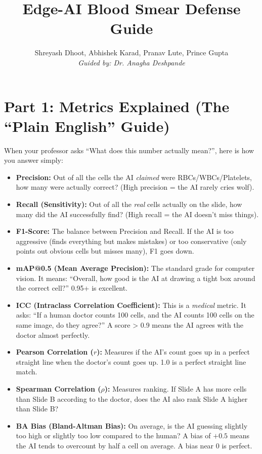\documentclass[12pt]{article}
\title{\textbf{Edge-AI Blood Smear Defense Guide}}
\author{Shreyash Dhoot, Abhishek Karad, Pranav Lute, Prince Gupta \\ \textit{Guided by: Dr. Anagha Deshpande}}
\date{}
\begin{document}
\maketitle

\section*{Part 1: Metrics Explained (The ``Plain English'' Guide)}
When your professor asks ``What does this number actually mean?'', here is how you answer simply:

\begin{itemize}
    \item \textbf{Precision:} Out of all the cells the AI \textit{claimed} were RBCs/WBCs/Platelets, how many were actually correct? (High precision = the AI rarely cries wolf).
    \item \textbf{Recall (Sensitivity):} Out of all the \textit{real} cells actually on the slide, how many did the AI successfully find? (High recall = the AI doesn't miss things).
    \item \textbf{F1-Score:} The balance between Precision and Recall. If the AI is too aggressive (finds everything but makes mistakes) or too conservative (only points out obvious cells but misses many), F1 goes down.
    \item \textbf{mAP@0.5 (Mean Average Precision):} The standard grade for computer vision. It means: ``Overall, how good is the AI at drawing a tight box around the correct cell?'' 0.95+ is excellent.
    \item \textbf{ICC (Intraclass Correlation Coefficient):} This is a \textit{medical} metric. It asks: ``If a human doctor counts 100 cells, and the AI counts 100 cells on the same image, do they agree?'' A score > 0.9 means the AI agrees with the doctor almost perfectly.
    \item \textbf{Pearson Correlation ($r$):} Measures if the AI's count goes up in a perfect straight line when the doctor's count goes up. 1.0 is a perfect straight line match.
    \item \textbf{Spearman Correlation ($\rho$):} Measures ranking. If Slide A has more cells than Slide B according to the doctor, does the AI also rank Slide A higher than Slide B? 
    \item \textbf{BA Bias (Bland-Altman Bias):} On average, is the AI guessing slightly too high or slightly too low compared to the human? A bias of $+0.5$ means the AI tends to overcount by half a cell on average. A bias near 0 is perfect.

\end{itemize}
\end{document}
